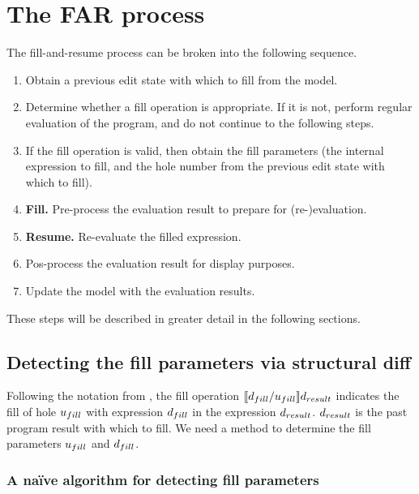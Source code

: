 \section{The FAR process}
\label{sec:far-process}

The fill-and-resume process can be broken into the following sequence.

\begin{enumerate}
\item Obtain a previous edit state with which to fill from the model.
\item Determine whether a fill operation is appropriate. If it is not, perform regular evaluation of the program, and do not continue to the following steps.
\item If the fill operation is valid, then obtain the fill parameters (the internal expression to fill, and the hole number from the previous edit state with which to fill).
\item \textbf{Fill.} Pre-process the evaluation result to prepare for (re-)evaluation.
\item \textbf{Resume.} Re-evaluate the filled expression.
\item Pos-process the evaluation result for display purposes.
\item Update the model with the evaluation results.
\end{enumerate}

These steps will be described in greater detail in the following sections.

\subsection{Detecting the fill parameters via structural diff}
\label{sec:obtaining-fill-parameters}

Following the notation from \cite{conf/popl/HazelnutLive19}, the fill operation $\llbracket{}d_{fill}/u_{fill}\rrbracket{}d_{result}$ indicates the fill of hole $u_{fill}$ with expression $d_{fill}$ in the expression $d_{result}$. $d_{result}$ is the past program result with which to fill. We need a method to determine the fill parameters $u_{fill}$ and $d_{fill}$.

\subsubsection{A na\"ive algorithm for detecting fill parameters}
\label{sec:far-detect-naive}

